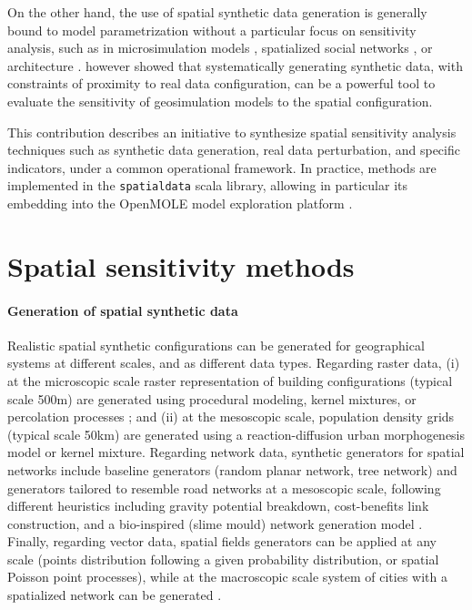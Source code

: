 \documentclass[11pt]{article}
\begin{document}
On the other hand, the use of spatial synthetic data generation is generally bound to model parametrization without a particular focus on sensitivity analysis, such as in microsimulation models \citep{smith2009improving}, spatialized social networks \citep{barrett2009generation}, or architecture \citep{penn2006synthetic}. \cite{raimbault2019space} however showed that systematically generating synthetic data, with constraints of proximity to real data configuration, can be a powerful tool to evaluate the sensitivity of geosimulation models to the spatial configuration.

This contribution describes an initiative to synthesize spatial sensitivity analysis techniques such as synthetic data generation, real data perturbation, and specific indicators, under a common operational framework. In practice, methods are implemented in the \texttt{spatialdata} scala library, allowing in particular its embedding into the OpenMOLE model exploration platform \citep{reuillon2013openmole}.


\section{Spatial sensitivity methods}

\paragraph{Generation of spatial synthetic data}

Realistic spatial synthetic configurations can be generated for geographical systems at different scales, and as different data types. Regarding raster data, (i) at the microscopic scale raster representation of building configurations (typical scale 500m) are generated using procedural modeling, kernel mixtures, or percolation processes \citep{doi:10.1162/isala00159}; and (ii) at the mesoscopic scale, population density grids (typical scale 50km) are generated using a reaction-diffusion urban morphogenesis model \citep{raimbault2018calibration} or kernel mixture. Regarding network data, synthetic generators for spatial networks include baseline generators (random planar network, tree network) and generators tailored to resemble road networks at a mesoscopic scale, following different heuristics including gravity potential breakdown, cost-benefits link construction, and a bio-inspired (slime mould) network generation model \citep{raimbault2018multi} \citep{raimbault2019urban}. Finally, regarding vector data, spatial fields generators can be applied at any scale (points distribution following a given probability distribution, or spatial Poisson point processes), while at the macroscopic scale system of cities with a spatialized network can be generated \citep{raimbault2020unveiling}.
\end{document}
